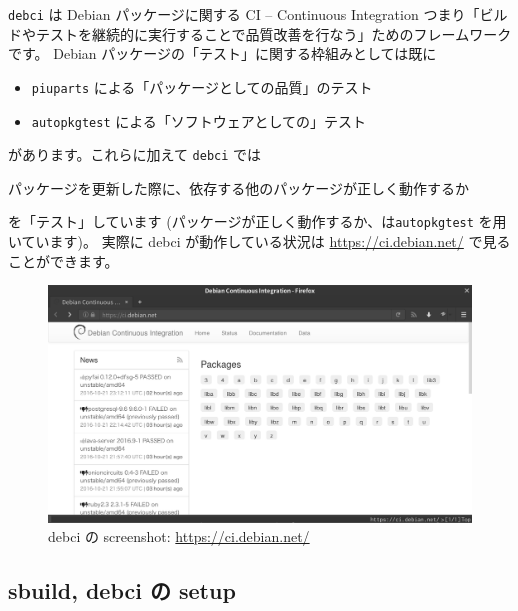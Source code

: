 \documentclass[mingoth,a4paper]{jsarticle}
\begin{document}
\texttt{debci} は Debian パッケージに関する
CI -- Continuous Integration
つまり「ビルドやテストを継続的に実行することで品質改善を行なう」ためのフレームワークです。
%
Debian パッケージの「テスト」に関する枠組みとしては既に
\begin{itemize}
\item %
  \texttt{piuparts} による「パッケージとしての品質」のテスト
\item %
  \texttt{autopkgtest} による「ソフトウェアとしての」テスト
\end{itemize}
があります。これらに加えて
\texttt{debci} では
\begin{center}
  パッケージを更新した際に、依存する他のパッケージが正しく動作するか
\end{center}
を「テスト」しています
(パッケージが正しく動作するか、は\texttt{autopkgtest} を用いています)。
%
実際に debci が動作している状況は
\url{https://ci.debian.net/} で見ることができます。
\begin{figure}[ht!]
  \centering
  \includegraphics[height=.2\textheight]{image201610/screenshot-debci_mono.png}
  \caption{debci の screenshot: \url{https://ci.debian.net/}}
\end{figure}

\subsection{sbuild, debci の setup}
\end{document}
